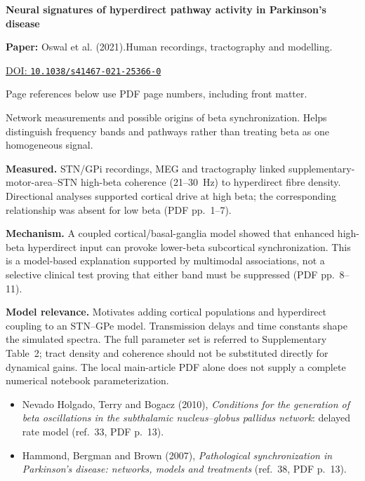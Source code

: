 

{\Large\bfseries Neural signatures of hyperdirect pathway activity in Parkinson's disease\par}

\textbf{Paper:} Oswal et al. (2021).\quad Human recordings, tractography and modelling.\par
\href{https://doi.org/10.1038/s41467-021-25366-0}{DOI: \nolinkurl{10.1038/s41467-021-25366-0}}\par
{\footnotesize Page references below use PDF page numbers, including front matter.}

Network measurements and possible origins of beta synchronization. Helps distinguish frequency bands and pathways rather than treating beta as one homogeneous signal.

\textbf{Measured.} STN/GPi recordings, MEG and tractography linked supplementary-motor-area--STN high-beta coherence (21--30~Hz) to hyperdirect fibre density. Directional analyses supported cortical drive at high beta; the corresponding relationship was absent for low beta (PDF pp.~1--7).

\textbf{Mechanism.} A coupled cortical/basal-ganglia model showed that enhanced high-beta hyperdirect input can provoke lower-beta subcortical synchronization. This is a model-based explanation supported by multimodal associations, not a selective clinical test proving that either band must be suppressed (PDF pp.~8--11).

\textbf{Model relevance.} Motivates adding cortical populations and hyperdirect coupling to an STN--GPe model. Transmission delays and time constants shape the simulated spectra. The full parameter set is referred to Supplementary Table~2; tract density and coherence should not be substituted directly for dynamical gains. The local main-article PDF alone does not supply a complete numerical notebook parameterization.

\begin{itemize}
\item Nevado Holgado, Terry and Bogacz (2010), \emph{Conditions for the generation of beta oscillations in the subthalamic nucleus--globus pallidus network}: delayed rate model (ref.~33, PDF p.~13).
\item Hammond, Bergman and Brown (2007), \emph{Pathological synchronization in Parkinson's disease: networks, models and treatments} (ref.~38, PDF p.~13).
\end{itemize}


